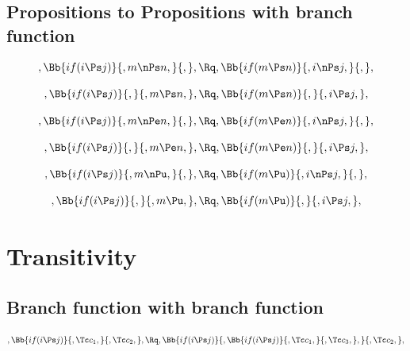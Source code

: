 \bigskip
\bigskip
\bigskip
\bigskip
\subsection{ Propositions to Propositions with branch function}
\[, \Bb{if(i \Ps j)}{,m \nPs n,}{,}, \Rq , \Bb{if(m \Ps n)}{,i \nPs j,}{,},\]

\bigskip
\bigskip
\[, \Bb{if(i \Ps j)}{,}{,m \Ps n,}, \Rq , \Bb{if(m \Ps n)}{,}{,i \Ps j,},\]

\bigskip
\bigskip
\[, \Bb{if(i \Ps j)}{,m \nPe n,}{,}, \Rq , \Bb{if(m \Pe n)}{,i \nPs j,}{,},\]

\bigskip
\bigskip
\[, \Bb{if(i \Ps j)}{,}{,m \Pe n,}, \Rq , \Bb{if(m \Pe n)}{,}{,i \Ps j,},\]

\bigskip
\bigskip
\[, \Bb{if(i \Ps j)}{,m \nPu,}{,}, \Rq , \Bb{if(m \Pu)}{,i \nPs j,}{,},\]

\bigskip
\bigskip
\[, \Bb{if(i \Ps j)}{,}{,m \Pu,}, \Rq , \Bb{if(m \Pu)}{,}{,i \Ps j,},\]

\bigskip
\bigskip
\bigskip
\bigskip
\section{Transitivity}
\subsection{Branch function with branch function}
\[, \Bb{if(i \Ps j)}{,\Tc c_1,}{,\Tc c_2,}, \Rq , \Bb{if(i \Ps j)}{,\Bb{if(i \Ps j)}{,\Tc c_1,}{,\Tc c_3,},}{,\Tc c_2,},\]

